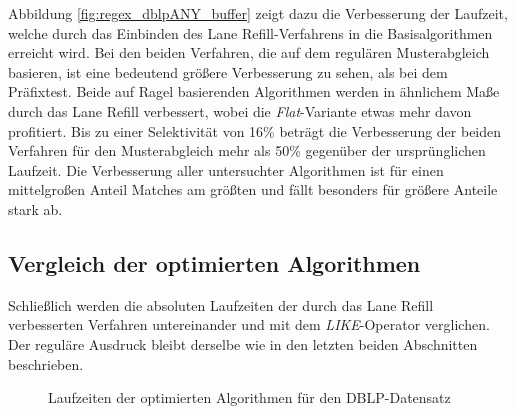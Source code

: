 Abbildung \ref{fig:regex_dblpANY_buffer} zeigt dazu die Verbesserung der Laufzeit, welche durch das Einbinden des Lane Refill-Verfahrens in die Basisalgorithmen erreicht wird.
Bei den beiden Verfahren, die auf dem regulären Musterabgleich basieren, ist eine bedeutend größere Verbesserung zu sehen, als bei dem Präfixtest.
Beide auf Ragel basierenden Algorithmen werden in ähnlichem Maße durch das Lane Refill verbessert, wobei die \emph{Flat}-Variante etwas mehr davon profitiert.
Bis zu einer Selektivität von 16\% beträgt die Verbesserung der beiden Verfahren für den Musterabgleich mehr als 50\% gegenüber der ursprünglichen Laufzeit.
Die Verbesserung aller untersuchter Algorithmen ist für einen mittelgroßen Anteil Matches am größten und fällt besonders für größere Anteile stark ab.

\subsection{Vergleich der optimierten Algorithmen}

Schließlich werden die absoluten Laufzeiten der durch das Lane Refill verbesserten Verfahren untereinander und mit dem \emph{LIKE}-Operator verglichen.
Der reguläre Ausdruck bleibt derselbe wie in den letzten beiden Abschnitten beschrieben.

\begin{figure}[ht]
	\centering
	\caption{Laufzeiten der optimierten Algorithmen für den DBLP-Datensatz}
	\label{fig:regex_dblpANY_optimal}
\end{figure}

